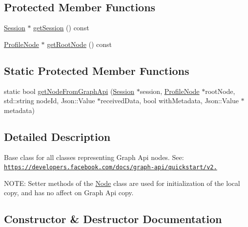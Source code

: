 \subsection*{Protected Member Functions}
\begin{DoxyCompactItemize}
\item 
\hyperlink{classfl4cpp_1_1_session}{Session} $\ast$ \hyperlink{classfl4cpp_1_1_node_a72051621dfa9fdfd5ed870e2e3e089a1}{get\+Session} () const 
\item 
\hyperlink{classfl4cpp_1_1_profile_node}{Profile\+Node} $\ast$ \hyperlink{classfl4cpp_1_1_node_a2eda6a3a1fe34bda85756436f76b1d12}{get\+Root\+Node} () const 
\end{DoxyCompactItemize}
\subsection*{Static Protected Member Functions}
\begin{DoxyCompactItemize}
\item 
static bool \hyperlink{classfl4cpp_1_1_node_a6f464292d56bbf6cba4dd29f0591d932}{get\+Node\+From\+Graph\+Api} (\hyperlink{classfl4cpp_1_1_session}{Session} $\ast$session, \hyperlink{classfl4cpp_1_1_profile_node}{Profile\+Node} $\ast$root\+Node, std\+::string node\+Id, Json\+::\+Value $\ast$received\+Data, bool with\+Metadata, Json\+::\+Value $\ast$metadata)
\end{DoxyCompactItemize}


\subsection{Detailed Description}
Base class for all classes representing Graph Api nodes. See\+: \href{https://developers.facebook.com/docs/graph-api/quickstart/v2.0}{\tt https\+://developers.\+facebook.\+com/docs/graph-\/api/quickstart/v2.}

N\+O\+TE\+: Setter methods of the \hyperlink{classfl4cpp_1_1_node}{Node} class are used for initialization of the local copy, and has no affect on Graph Api copy. 

\subsection{Constructor \& Destructor Documentation}
